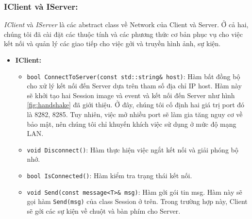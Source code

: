 \subsubsection{IClient và IServer: }
\textit{IClient} và \textit{IServer} là các abstract class về Network của Client và Server. Ở cả hai, chúng tôi đã cài đặt các thuộc tính và các phương thức cơ bản phục vụ cho việc kết nối và quản lý các giao tiếp cho việc gởi và truyền hình ảnh, sự kiện.  
\begin{itemize}
	\item \textbf{IClient: } 
	\begin{itemize}
		\item[] \lstinline{bool ConnectToServer(const std::string& host)}: Hàm bất đồng bộ cho xử lý kết nối đến Server dựa trên tham số địa chỉ IP host. Hàm này sẽ khởi tạo hai Session image và event và kết nối đến Server như hình \ref{fig:handshake} đã giới thiệu. Ở đây, chúng tôi cố định hai giá trị port đó là 8282, 8285. Tuy nhiên, việc mở nhiều port sẽ làm gia tăng nguy cơ về bảo mật, nên chúng tôi chỉ khuyến khích việc sử dụng ở mức độ mạng LAN.
		\item[] \lstinline{void Disconnect()}: Hàm thực hiện việc ngắt kết nối và giải phóng bộ nhớ.
		\item[] \lstinline{bool IsConnected()}: Hàm kiểm tra trạng thái kết nối.
		\item[] \lstinline{void Send(const message<T>& msg)}: Hàm gởi gói tin msg. Hàm này sẽ gọi hàm \lstinline{Send(msg)} của class Session ở trên. Trong trường hợp này, Client sẽ gởi các sự kiện về chuột và bàn phím cho Server.
	\end{itemize}
\end{itemize}

